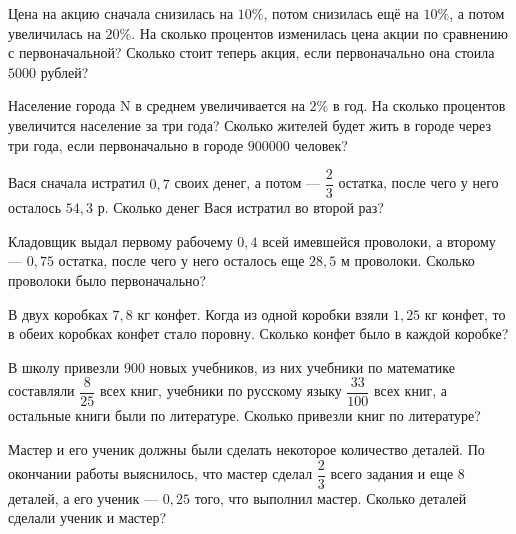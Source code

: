 \begin{class}[number=3]
	\begin{listofex}
		\item Цена на акцию сначала снизилась на \( 10 \% \), потом снизилась ещё на \(10 \% \), а потом увеличилась на \(20\%\). На сколько процентов изменилась цена акции по сравнению с первоначальной? Сколько стоит теперь акция, если первоначально она стоила \(5000\) рублей?
		\item Население города N в среднем увеличивается на \(2\%\) в год. На сколько процентов увеличится население за три года? Сколько жителей будет жить в городе через три года, если первоначально в городе \(900000\) человек?
		\item Вася сначала истратил \(0,7\) своих денег, а потом --- \(\dfrac{2}{3} \) остатка, после чего у него осталось \(54,3\) р. Сколько денег Вася истратил во второй раз?
		\item Кладовщик выдал первому рабочему \(0,4\) всей имевшейся проволоки, а второму --- \(0,75\) остатка, после чего у него осталось еще \(28,5\) м проволоки. Сколько проволоки было первоначально?
		\item В двух коробках \(7,8\) кг конфет. Когда из одной коробки взяли \(1,25\) кг конфет, то в обеих коробках конфет стало поровну. Сколько конфет было в каждой коробке?
		\item В школу привезли \(900\) новых учебников, из них учебники по математике составляли \(\dfrac{8}{25}\) всех книг, учебники по русскому языку \(\dfrac{33}{100}\) всех книг, а остальные книги были по литературе. Сколько привезли книг по литературе?
		\item Мастер и его ученик должны были сделать некоторое количество деталей. По окончании работы выяснилось, что мастер сделал \(\dfrac{2}{3}\) всего задания и еще \(8\) деталей, а его ученик --- \(0,25\) того, что выполнил мастер. Сколько деталей сделали ученик и мастер?
	\end{listofex}
\end{class}

